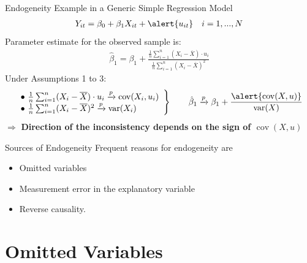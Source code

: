 \documentclass[11pt, aspectratio = 169]{beamer}
\begin{document}
\begin{frame}[fragile]{Endogeneity Example in a Generic Simple Regression Model}  
     \vspace{-4mm}  
    \begin{align*}
        Y_{it} = \beta_0 + \beta_1 X_{it} + \alert{u_{it}} \quad i=1,...,N
    \end{align*}
    \vspace{2mm}
    \pause
    Parameter estimate for the observed sample is:
    \begin{align*}
        \hat{\beta}_1 = \beta_1 + \frac{\frac{1}{n} \sum_{i=1}^n(X_i - \overline{X}) \cdot u_i}{\frac{1}{n} \sum_{i=1}^n(X_i - \overline{X})^2}
    \end{align*}
    \vspace{1mm}
\pause
Under Assumptions 1 to 3:
\[
\left.
\begin{array}{l}
\bullet\ \frac{1}{n} \sum_{i=1}^n (X_i - \overline{X}) \cdot u_i 
    \xrightarrow{p} \operatorname{cov}(X_i, u_i) \\
\bullet\ \frac{1}{n} \sum_{i=1}^n (X_i - \overline{X})^2 
    \xrightarrow{p} \operatorname{var}(X_i)
\end{array}
\right\}
\qquad 
\hat{\beta}_1 \xrightarrow{p} \beta_1 + \frac{\alert{\operatorname{cov}(X,u)}}{\operatorname{var}(X)}
\]
\pause
$\Rightarrow$ \textbf{Direction of the inconsistency depends on the sign of \alert{$\operatorname{cov}(X,u)$}}
\end{frame}

\begin{frame}{Sources of Endogeneity}
Frequent reasons for endogeneity are
\begin{itemize}
    \item Omitted variables
    \item Measurement error in the explanatory variable
    \item Reverse causality.
\end{itemize}
\end{frame}

\section{Omitted Variables}
\end{document}
